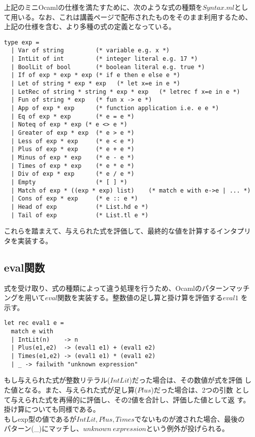 \documentclass[a4paper,9pt]{jsarticle}
\begin{document}
上記のミニOcamlの仕様を満たすために、次のような式の種類を$Syntax.ml$とし
て用いる。なお、これは講義ページで配布されたものをそのまま利用するため、
上記の仕様を含む、より多種の式の定義となっている。

\begin{lstlisting}
type exp = 
  | Var of string         (* variable e.g. x *)
  | IntLit of int         (* integer literal e.g. 17 *)
  | BoolLit of bool       (* boolean literal e.g. true *)
  | If of exp * exp * exp (* if e then e else e *)
  | Let of string * exp * exp   (* let x=e in e *)
  | LetRec of string * string * exp * exp   (* letrec f x=e in e *)
  | Fun of string * exp   (* fun x -> e *)
  | App of exp * exp      (* function application i.e. e e *)
  | Eq of exp * exp       (* e = e *)
  | Noteq of exp * exp (* e <> e *)
  | Greater of exp * exp  (* e > e *)
  | Less of exp * exp     (* e < e *)
  | Plus of exp * exp     (* e + e *)
  | Minus of exp * exp    (* e - e *)
  | Times of exp * exp    (* e * e *)
  | Div of exp * exp      (* e / e *)
  | Empty                 (* [ ] *)
  | Match of exp * ((exp * exp) list)    (* match e with e->e | ... *)
  | Cons of exp * exp     (* e :: e *)
  | Head of exp           (* List.hd e *)
  | Tail of exp           (* List.tl e *)
\end{lstlisting}

これらを踏まえて、与えられた式を評価して、最終的な値を計算するインタプリ
タを実装する。

\subsection{eval関数}

式を受け取り、式の種類によって違う処理を行うため、Ocamlのパターンマッチ
ングを用いて$eval$関数を実装する。整数値の足し算と掛け算を評価する$eval1$
を示す。

\begin{lstlisting}
let rec eval1 e =
  match e with
  | IntLit(n)    -> n
  | Plus(e1,e2)  -> (eval1 e1) + (eval1 e2)
  | Times(e1,e2) -> (eval1 e1) * (eval1 e2)
  | _ -> failwith "unknown expression"
\end{lstlisting}

もし与えられた式が整数リテラル($IntLit$)だった場合は、その数値が式を評価
した値となる。また、与えられた式が足し算($Plus$)だった場合は、2つの引数
として与えられた式を再帰的に評価し、その2値を合計し、評価した値として返
す。掛け算についても同様である。\\
もしexp型の値であるが$IntLit,Plus,Times$でないものが渡された場合、最後の
パターン(\_)にマッチし、$unknown\ expression$という例外が投げられる。\\
\end{document}

